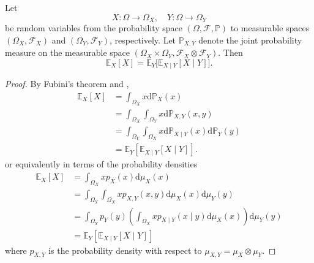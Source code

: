 \begin{theorem}
	\label{theorem:total_expectation}
	Let
	\begin{equation}
		X\colon \Omega \to \Omega_X, \quad Y\colon \Omega \to \Omega_Y
	\end{equation}
	be random variables from the probability space $(\Omega, \mathcal{F}, \mathbb{P})$ to measurable spaces $(\Omega_X, \mathcal{F}_X)$ and $(\Omega_Y, \mathcal{F}_Y)$, respectively. Let $\mathbb{P}_{X,Y}$ denote the joint probability measure on the measurable space $(\Omega_X \times \Omega_Y, \mathcal{F}_X \otimes \mathcal{F}_Y)$. Then
	\begin{equation}
		\mathbb{E}_X[X] = \mathbb{E}_Y\big[\mathbb{E}_{X\mid Y}[X \mid Y]\big].
	\end{equation}
\end{theorem}

\begin{proof}
	By Fubini's theorem and ,
	\begin{equation}
		\begin{split}
			\mathbb{E}_X[X] 
			&= \int_{\Omega_X} x \mathrm{d}\mathbb{P}_X(x)\\
			&= \int_{\Omega_X}\int_{\Omega_Y} x \mathrm{d}\mathbb{P}_{X,Y}(x,y)\\
			&= \int_{\Omega_Y}\int_{\Omega_X} x \mathrm{d}\mathbb{P}_{X\mid Y}(x)\mathrm{d}\mathbb{P}_Y(y)\\
			&= \mathbb{E}_Y[\mathbb{E}_{X\mid Y}[X\mid Y]].
		\end{split}
	\end{equation}
	or equivalently in terms of the probability densities
	\begin{equation}
		\begin{split}
			\mathbb{E}_X[X] 
			&= \int_{\Omega_X} x p_X(x) \mathrm{d}\mu_X(x)\\
			&= \int_{\Omega_Y} \int_{\Omega_X} x p_{X,Y}(x,y) \mathrm{d}\mu_X(x) \mathrm{d}\mu_Y(y)\\
			&= \int_{\Omega_Y} p_Y(y) \left( \int_{\Omega_X} x p_{X\mid Y}(x\mid y) \mathrm{d}\mu_X(x) \right) \mathrm{d}\mu_Y(y)\\
			&= \mathbb{E}_Y[\mathbb{E}_{X\mid Y}[X\mid Y]]
		\end{split}
	\end{equation}
	where $p_{X,Y}$ is the probability density with respect to $\mu_{X,Y} = \mu_X \otimes \mu_Y$.
\end{proof}

